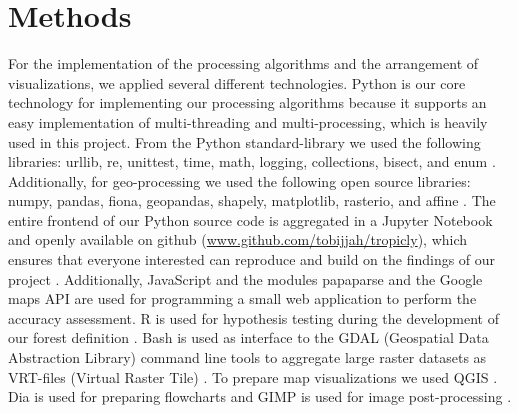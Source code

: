 \section{Methods}
\label{sec:methods}
	For the implementation of the processing algorithms and the arrangement of visualizations, we applied several different technologies. Python is our core technology for implementing our processing algorithms because it supports an easy implementation of multi-threading and multi-processing, which is heavily used in this project. From the Python standard-library we used the following libraries: urllib, re, unittest, time, math, logging, collections, bisect, and enum \citep{Rossum2018}. Additionally, for geo-processing we used the following open source libraries: numpy, pandas, fiona, geopandas, shapely, matplotlib, rasterio, and affine \citep{Hunter2007,McKinney2010,Millman2011,Gillies2013,GeoPandas2018}. The entire frontend of our Python source code is aggregated in a Jupyter Notebook and openly available on github (\url{www.github.com/tobijjah/tropicly}), which ensures that everyone interested can reproduce and build on the findings of our project \citep{Kluyver2016}. Additionally, JavaScript and the modules papaparse and the Google maps \ac{API} are used for programming a small web application to perform the accuracy assessment. R is used for hypothesis testing during the development of our forest definition \citep{R2018}. Bash is used as interface to the GDAL (Geospatial Data Abstraction Library) command line tools to aggregate large raster datasets as VRT-files (Virtual Raster Tile) \citep{GDAL2018,Bash2013}. To prepare map visualizations we used QGIS \citep{QGIS2019}. Dia is used for preparing flowcharts and GIMP is used for image post-processing \citep{GIMP2018}.

